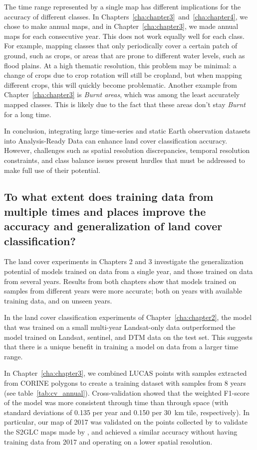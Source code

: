             The time range represented by a single map has different implications for the accuracy of different classes. In Chapters\@~\ref{cha:chapter3}\@~and\@~\ref{cha:chapter4}, we chose to make annual maps, and in Chapter\@~\ref{cha:chapter3}, we made annual maps for each consecutive year. This does not work equally well for each class. For example, mapping classes that only periodically cover a certain patch of ground, such as crops, or areas that are prone to different water levels, such as flood plains. At a high thematic resolution, this problem may be minimal: a change of crops due to crop rotation will still be cropland, but when mapping different crops, this will quickly become problematic. Another example from Chapter\@~\ref{cha:chapter3} is \textit{Burnt areas}, which was among the least accurately mapped classes. This is likely due to the fact that these areas don't stay \textit{Burnt} for a long time.

            

        In conclusion, integrating large time-series and static Earth observation datasets into Analysis-Ready Data can enhance land cover classification accuracy. However, challenges such as spatial resolution discrepancies, temporal resolution constraints, and class balance issues present hurdles that must be addressed to make full use of their potential.
            
    \subsection{To what extent does training data from multiple times and places improve the accuracy and generalization of land cover classification?}
    \label{syn:rq2}
    
        The land cover experiments in Chapters 2 and 3 investigate the generalization potential of models trained on data from a single year, and those trained on data from several years. Results from both chapters show that models trained on samples from different years were more accurate; both on years with available training data, and on unseen years.

        In the land cover classification experiments of Chapter~\ref{cha:chapter2}, the model that was trained on a small multi-year Landsat-only data outperformed the model trained on Landsat, sentinel, and DTM data on the test set. This suggests that there is a unique benefit in training a model on data from a larger time range.
        
        In Chapter~\ref{cha:chapter3}, we combined LUCAS points with samples extracted from CORINE polygons to create a training dataset with samples from 8 years (see table~\ref{tab:cv_annual}). Cross-validation showed that the weighted F1-score of the model was more consistent through time than through space (with standard deviations of 0.135 per year and 0.150 per 30~km tile, respectively). 
        In particular, our map of 2017 was validated on the points collected by \citep{jenerowicz2021validation} to validate the S2GLC maps made by \citet{malinowski2020automated}, and achieved a similar accuracy without having training data from 2017 and operating on a lower spatial resolution.


